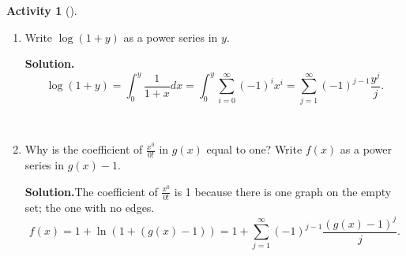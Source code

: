 \documentclass[10pt,]{book}
\theoremstyle{plain}
\theoremstyle{definition}
\newtheorem{activity}[project]{Activity}
\numberwithin{equation}{chapter}
\begin{document}
\begin{activity}[]
\begin{enumerate}[label=(\alph*)]
~\par
\item Write \(\log(1+y)\) as a power series in \(y\).%
\par\medskip\noindent%
\textbf{Solution.}\quad %
\begin{equation*}
\log(1+y)=\int_0^y \frac{1}{1+x}dx =\int_0^y \sum_{i=0}^\infty
(-1)^ix^i = \sum_{j=1}^\infty (-1)^{j-1}\frac{y^j}{j}.
\end{equation*}

~\par
\item Why is the coefficient of \(\frac{x^0}{0!}\) in \(g(x)\) equal to one?  Write \(f(x)\) as a power series in \(g(x) -1\).%
\par\medskip\noindent%
\textbf{Solution.}\quad The coefficient of \(\frac{x^0}{0!}\) is 1 because there is one graph on the empty set; the one with no edges.%
\begin{equation*}
f(x) = 1 +\ln(1 +
(g(x)-1))=1+\sum_{j=1}^\infty (-1)^{j-1}\frac{(g(x)-1)^j}{j}.
\end{equation*}
%


\end{enumerate}
\end{activity}
\end{document}
